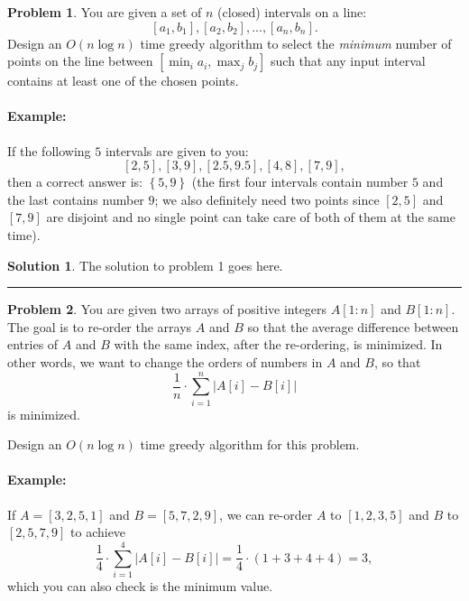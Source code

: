 \documentclass{article}
\theoremstyle{definition}
\newtheorem{problem}{Problem}
\def\fline{\rule{0.75\linewidth}{0.5pt}}
\newcommand{\finishline}{\begin{center}\fline\end{center}}
\newtheorem*{solution*}{Solution}
\newenvironment{solution}{\begin{solution*}}{{\finishline} \end{solution*}}
\newcommand{\set}[1]{\ensuremath{\left\{ #1 \right\}}}
\begin{document}
\begin{problem}

	You are given a set of $n$ (closed) intervals on a line:
\[
[a_{1}, b_{1}], [a_{2}, b_{2}], . . . ,[a_{n}, b_{n}].
\]
Design an $O(n\log{n})$ time {greedy} algorithm to select the \emph{minimum} number of points on the line between $[\min_i a_i, \max_j b_j]$ such that any input interval contains at least one of the chosen points.

\paragraph{Example:} If the following  $5$ intervals are given to you: $$[2,5] , [3,9] , [2.5,9.5] , [4,8], [7,9],$$ then a correct answer is: $\set{5,9}$ (the first four intervals contain number $5$ and the last contains number $9$; we also definitely 
need two points since $[2,5]$ and $[7,9]$ are disjoint and no single point can take care of both of them at the same time). 

\end{problem} 

\begin{solution}
The solution to problem 1 goes here. 
\end{solution}

\bigskip

\begin{problem}

	You are given two arrays of positive integers $A[1:n]$ and $B[1:n]$. The goal is to re-order the arrays $A$ and $B$ so that the average difference between entries of $A$ and $B$ with the same index, after the re-ordering, is minimized.
	In other words, we want to change the orders of numbers in $A$ and $B$, so that 
	\[
		\frac{1}{n} \cdot \sum_{i=1}^{n} \left |A[i] - B[i] \right |
	\]
	is minimized. 
	
	
Design an $O(n\log{n})$ time greedy algorithm for this problem. 

\paragraph{Example:} If $A=[3,2,5,1]$ and $B=[5,7,2,9]$, we can re-order $A$ to $[1,2,3,5]$ and $B$ to $[2,5,7,9]$ to achieve 
\[
	\frac{1}{4} \cdot  \sum_{i=1}^{4} |A[i]-B[i]| = \frac{1}{4} \cdot ({1+3+4+4}) = 3, 
\]
which you can also check is the minimum value. 


\end{problem} 
\end{document}
